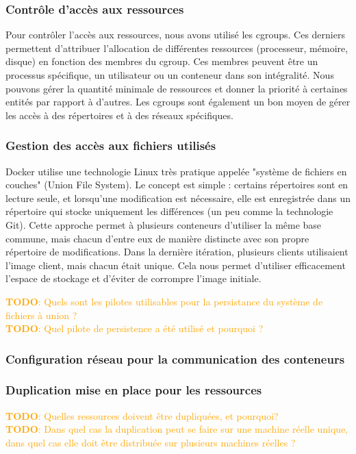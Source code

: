 \documentclass[a11paper, 11pt]{article}
\newcommand{\todo}[1]{\textcolor{orange}{\textbf{TODO}: #1}}
\begin{document}
\subsubsection{Contrôle d'accès aux ressources}

Pour contrôler l'accès aux ressources, nous avons utilisé les cgroups. Ces derniers permettent d'attribuer l'allocation de différentes ressources (processeur, mémoire, disque) en fonction des membres du cgroup. Ces membres peuvent être un processus spécifique, un utilisateur ou un conteneur dans son intégralité. Nous pouvons gérer la quantité minimale de ressources et donner la priorité à certaines entités par rapport à d'autres. Les cgroups sont également un bon moyen de gérer les accès à des répertoires et à des réseaux spécifiques.

\subsubsection{Gestion des accès aux fichiers utilisés}


Docker utilise une technologie Linux très pratique appelée "système de fichiers en couches" (Union File System). Le concept est simple : certains répertoires sont en lecture seule, et lorsqu'une modification est nécessaire, elle est enregistrée dans un répertoire qui stocke uniquement les différences (un peu comme la technologie Git). Cette approche permet à plusieurs conteneurs d'utiliser la même base commune, mais chacun d'entre eux de manière distincte avec son propre répertoire de modifications. Dans la dernière itération, plusieurs clients utilisaient l'image client, mais chacun était unique. Cela nous permet d'utiliser efficacement l'espace de stockage et d'éviter de corrompre l'image initiale.


\todo{Quels sont les pilotes utilisables pour la persistance du système de fichiers
à union ?} \\
\todo{Quel pilote de persistence a été utilisé et pourquoi ?}

\subsubsection{Configuration réseau pour la communication des conteneurs}

\subsubsection{Duplication mise en place pour les ressources}

\todo{Quelles ressources doivent être dupliquées, et pourquoi?} \\
\todo{Dans quel cas la duplication peut se faire sur une machine réelle unique, dans
quel cas elle doit être distribuée sur plusieurs machines réelles ?}


\end{document}
